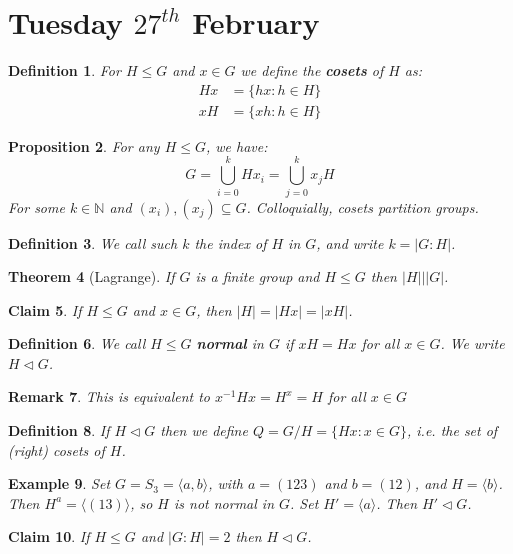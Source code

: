 \documentclass[a4paper,10pt]{article}
\newcommand{\NN}{\mathbb{N}}
\newtheorem{thm}{Theorem}
\newtheorem{Def}[thm]{Definition}
\newtheorem{cl}[thm]{Claim}
\newtheorem{prop}[thm]{Proposition}
\newtheorem{eg}[thm]{Example}
\newtheorem{rem}[thm]{Remark}
\begin{document}
\newpage
\section{Tuesday $27^{th}$ February}

\begin{Def}
For $H \leq G$ and $x \in G$ we define the \textbf{cosets} of $H$ as:
\begin{align*}
Hx &= \{hx : h \in H \} \\
xH &= \{xh : h \in H \}
\end{align*}

\end{Def}
\begin{prop}
For any $H \leq G$, we have:
\[ G = \bigcup_{i=0}^k Hx_i = \bigcup_{j=0}^k x_jH \]
For some $k \in \NN$ and $(x_i), (x_j) \subseteq G$. Colloquially, cosets partition groups.
\end{prop}
\begin{Def}
We call such $k$ the index of $H$ in $G$, and write $k = |G : H|$. 
\end{Def}
\begin{thm}[Lagrange]
If $G$ is a finite group and $H \leq G$ then $|H| \big| |G|$.
\end{thm}
\begin{cl}
If $H \leq G$ and $x \in G$, then $|H| = |Hx| = |xH|$.
\end{cl}
\begin{Def}
We call $H \leq G$ \textbf{normal} in $G$ if $xH = Hx$ for all $x \in G$. We write $H \triangleleft G$. 
\end{Def}
\begin{rem}
This is equivalent to $x^{-1}Hx = H^x = H$ for all $x \in G$
\end{rem}
\begin{Def}
If $H \triangleleft G$ then we define $Q = G / H = \{Hx : x \in G\}$, i.e. the set of (right) cosets of $H$.
\end{Def}
\begin{eg}
Set $G = S_3 = \langle a,b\rangle$, with $a = (123)$ and $b = (12)$, and $H = \langle b \rangle$. Then $H^a = \langle (13) \rangle$, so $H$ is not normal in $G$. Set $H' = \langle a \rangle$. Then $H' \triangleleft G$.
\end{eg}
\begin{cl}
If $H \leq G$ and $|G : H| = 2$ then $H \triangleleft G$.
\end{cl}
\end{document}
